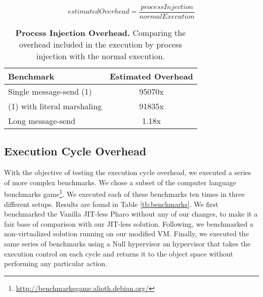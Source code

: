 \begin{equation*}
estimatedOverhead = \frac{processInjection}{normalExecution}
\end{equation*}

\begin{table}[ht]
 	\centering
 	\begin{tabular}{lc}
			\toprule
			\textbf{Benchmark}
 			& \textbf{Estimated Overhead}\\
		\midrule
		Single message-send (1) & 95070x \\\midrule
		(1) with literal marshaling & 91835x \\\midrule
		Long message-send & 1.18x  \\\midrule
 	\end{tabular}
	\vspace*{0.2cm}
 	\caption{\textbf{Process Injection Overhead.} Comparing the overhead included in the execution by process injection with the normal execution.\label{tb:benchmarks_injection_comparison}}
 \end{table}

\subsection{Execution Cycle Overhead}
With the objective of testing the execution cycle overhead, we executed a series of more complex benchmarks. We chose a subset of the computer language benchmarks game\footnote{\url{http://benchmarksgame.alioth.debian.org/}}. We executed each of these benchmarks ten times in three different setups. Results are found in Table \ref{tb:benchmarks}. We first benchmarked the Vanilla JIT-less Pharo \VM without any of our changes, to make it a fair base of comparison with our JIT-less solution. Following, we benchmarked a non-virtualized solution running on our modified VM. Finally, we executed the same series of benchmarks using a Null hypervisor \ie an hypervisor that takes the execution control on each cycle and returns it to the object space without performing any particular action.



